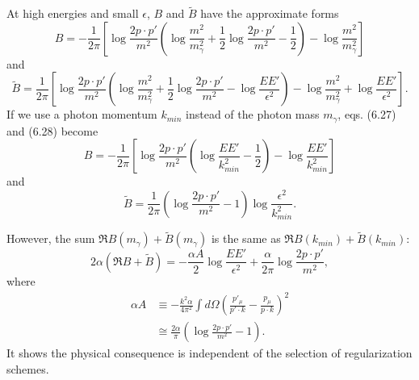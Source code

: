 At high energies and small $\epsilon$, $B$ and $\tilde{B}$ have the approximate forms
\begin{equation}
B = -\frac{1}{2\pi}\left[ \log\frac{2p\cdot p'}{m^2}\left( \log\frac{m^2}{m_\gamma^2} +\frac{1}{2}\log\frac{2p\cdot p'}{m^2} - \frac{1}{2}\right) - \log\frac{m^2}{m_\gamma^2} \right]
\end{equation}
and
\begin{equation}
\tilde{B} = \frac{1}{2\pi}\left[ \log\frac{2p\cdot p'}{m^2}\left( \log\frac{m^2}{m_\gamma^2} +\frac{1}{2}\log\frac{2p\cdot p'}{m^2} - \log\frac{EE'}{\epsilon^2}\right) - \log\frac{m^2}{m_\gamma^2} + \log\frac{EE'}{\epsilon^2}\right].
\end{equation}
If we use a photon momentum $k_{min}$ instead of the photon mass $m_\gamma$, eqs. (6.27) and (6.28) become
\begin{equation}
B = -\frac{1}{2\pi}\left[ \log\frac{2p\cdot p'}{m^2}\left( \log\frac{EE'}{k_{min}^2} - \frac{1}{2}\right) - \log\frac{EE'}{k_{min}^2} \right]
\end{equation}
and
\begin{equation}
\tilde{B} = \frac{1}{2\pi}\left( \log\frac{2p\cdot p'}{m^2} - 1 \right)\log\frac{\epsilon^2}{k_{min}^2}.
\end{equation}

However, the sum $\Re B(m_\gamma) + \tilde{B}(m_\gamma)$ is the same as $\Re B(k_{min}) + \tilde{B}(k_{min})$:
\begin{equation}
2\alpha(\Re B +\tilde{B}) = -\frac{\alpha A}{2}\log\frac{EE'}{\epsilon^2} + \frac{\alpha}{2\pi}\log\frac{2p\cdot p'}{m^2},
\end{equation}
where
\begin{align}
\alpha A &\equiv -\frac{k^2\alpha}{4\pi^2}\int d\Omega \left( \frac{p'_\mu}{p'\cdot k} - \frac{p_\mu}{p\cdot k}\right)^2\nonumber\\
&\cong \frac{2\alpha}{\pi}\left( \log\frac{2p\cdot p'}{m^2} - 1 \right).
\end{align}
It shows the physical consequence is independent of the selection of regularization schemes.
\newpage
